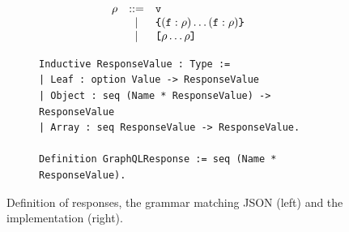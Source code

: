 \begin{figure}[t!]
\centering
\begin{subfigure}{.5\textwidth}

  \begin{displaymath}
	\begin{array}{rcl}
	\rho & ::= & \texttt{v}\\
	& | & \texttt{\{} (\texttt{f} : \rho) \ldots (\texttt{f} : \rho) \texttt{\}} \\
	& | & \texttt{[} \rho \ldots \rho \texttt{]}
	\end{array}
	\end{displaymath}
	
	

 
  \end{subfigure}%
  \begin{subfigure}{.5\textwidth}
\begin{verbatim}
Inductive ResponseValue : Type :=
| Leaf : option Value -> ResponseValue
| Object : seq (Name * ResponseValue) -> ResponseValue
| Array : seq ResponseValue -> ResponseValue.
  
Definition GraphQLResponse := seq (Name * ResponseValue).
\end{verbatim}
   
  \end{subfigure}
  \caption{Definition of \gql responses, the grammar matching JSON (left) and the \coq implementation (right).
  }
  \label{fig:response_def}

\end{figure}


